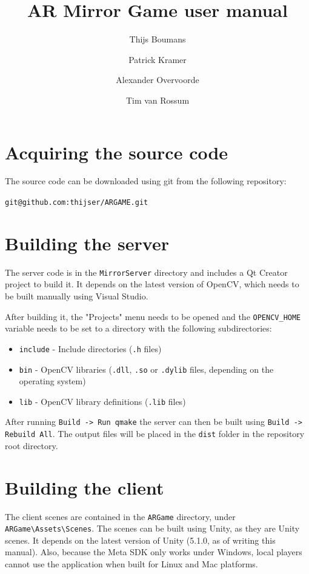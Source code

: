 \documentclass{report}
\title{AR Mirror Game user manual}
\author{Thijs Boumans \and Patrick Kramer \and Alexander Overvoorde \and Tim van Rossum}
\begin{document}
\maketitle

\section*{Acquiring the source code}
	The source code can be downloaded using git from the following repository:
	
	\verb#git@github.com:thijser/ARGAME.git#

\section*{Building the server}
	The server code is in the \verb#MirrorServer# directory and includes a Qt
	Creator project to build it. It depends on the latest version of OpenCV, which
	needs to be built manually using Visual Studio.
	
	After building it, the "Projects" menu needs to be opened and the
	\verb#OPENCV_HOME# variable needs to be set to a directory with the following
	subdirectories:

	\begin{itemize}
	    \item \verb#include# - Include directories (\texttt{.h} files)
	    \item \verb#bin# - OpenCV libraries (\texttt{.dll}, \texttt{.so} or \texttt{.dylib} files, depending on the operating system)
	    \item \verb#lib# - OpenCV library definitions (\texttt{.lib} files)
	\end{itemize}
	
	After running \verb#Build -> Run qmake# the server can then be built using
	\verb#Build -> Rebuild All#. The output files will be placed in the \verb#dist#
	folder in the repository root directory.

\section*{Building the client}
	The client scenes are contained in the \verb#ARGame# directory, under 
	\verb#ARGame\Assets\Scenes#. The scenes can be built using Unity, as they are 
	Unity scenes. It depends on the latest version of Unity (5.1.0, as of writing 
	this manual). Also, because the Meta SDK only works under Windows, local players
	cannot use the application when built for Linux and Mac platforms.
	
\end{document}
